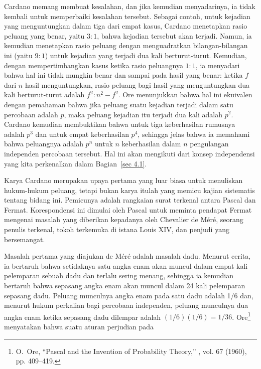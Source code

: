 Cardano memang membuat kesalahan, dan jika kemudian menyadarinya, ia tidak kembali untuk
memperbaiki kesalahan tersebut.  Sebagai contoh, untuk kejadian yang menguntungkan dalam tiga dari
empat kasus,
Cardano menetapkan rasio peluang yang benar, yaitu $3 : 1$, bahwa kejadian tersebut akan
terjadi.  Namun, ia kemudian menetapkan rasio peluang dengan menguadratkan bilangan-bilangan ini (yaitu $9 :
1$) untuk kejadian yang terjadi dua kali berturut-turut.  Kemudian, dengan mempertimbangkan kasus
ketika rasio peluangnya $1 : 1$, ia menyadari bahwa hal ini tidak mungkin benar dan
sampai pada hasil yang benar: ketika $f$ dari $n$ hasil
menguntungkan, rasio peluang bagi hasil yang menguntungkan dua kali berturut-turut adalah $f^2 : n^2 -
f^2$.  Ore menunjukkan bahwa hal ini ekuivalen dengan pemahaman bahwa jika
peluang suatu kejadian terjadi dalam satu percobaan adalah $p$, maka peluang
kejadian itu
terjadi dua kali adalah $p^2$.  Cardano kemudian membuktikan bahwa untuk tiga
keberhasilan rumusnya adalah $p^3$ dan untuk empat keberhasilan $p^4$, sehingga
jelas bahwa ia memahami bahwa peluangnya adalah $p^n$ untuk $n$ keberhasilan dalam
$n$
pengulangan independen percobaan tersebut.  Hal ini akan mengikuti dari
konsep independensi yang kita perkenalkan dalam Bagian~\ref{sec 4.1}. 
\par
Karya Cardano merupakan upaya pertama yang luar biasa untuk menuliskan hukum-hukum
peluang, tetapi bukan karya itulah yang memicu kajian sistematis
tentang bidang ini.  Pemicunya adalah rangkaian surat terkenal antara Pascal dan Fermat. 
Korespondensi ini dimulai oleh Pascal untuk meminta pendapat Fermat mengenai masalah yang
diberikan kepadanya oleh Chevalier de M\'er\'e, seorang penulis terkenal,
tokoh terkemuka di istana Louis XIV, dan penjudi yang bersemangat.
\par
Masalah pertama yang diajukan de M\'er\'e adalah masalah dadu.  Menurut cerita, ia
bertaruh bahwa setidaknya satu angka enam akan muncul dalam empat kali pelemparan sebuah dadu dan
terlalu sering menang, sehingga ia kemudian bertaruh bahwa sepasang angka enam akan muncul dalam 24 kali
pelemparan sepasang dadu.  Peluang munculnya angka enam pada satu dadu adalah 1/6 dan, menurut
hukum perkalian bagi percobaan independen, peluang munculnya dua angka enam ketika
sepasang dadu dilempar adalah $(1/6)(1/6) = 1/36$.  Ore\footnote{O.\ Ore,
``Pascal and the Invention of Probability Theory,'' , vol. 67 (1960), pp. 409--419.} menyatakan bahwa suatu aturan perjudian pada
